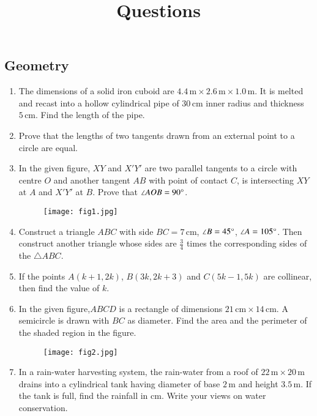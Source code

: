 \documentclass[12pt,letter paper]{article}
\title{Questions}
\date{}
\author{}
\providecommand{\brak}[1]{\ensuremath{\left(#1\right)}}
\begin{document}
\maketitle{}
\begin{center}
	\section*{Geometry}
\end{center}
\begin{enumerate}
    \item The dimensions of a solid iron cuboid are $4.4\,\mathrm{m} \times 2.6\,\mathrm{m} \times 1.0\,\mathrm{m}$. It is melted and recast into a hollow cylindrical pipe of $30\,\mathrm{cm}$ inner radius and thickness $5\,\mathrm{cm}$. Find the length of the pipe.
    \item Prove that the lengths of two tangents drawn from an external point to a circle are equal.
    \item In the given figure, $XY$ and $X'Y'$ are two parallel tangents to a circle with centre $O$ and another tangent $AB$ with point of contact $C$, is intersecting $XY$ at $A$ and $X'Y'$ at $B$. Prove that $\angle AOB = 90\degree$.
\begin{figure}[H]
\centering
\texttt{[image: fig1.jpg]}
\caption{}
\end{figure}
    \item Construct a triangle $ABC$ with side $BC = 7\,\mathrm{cm}$, $\angle B = 45\degree$, $\angle A = 105\degree$. Then construct another triangle whose sides are $\frac{3}{4}$ times the corresponding sides of the $\triangle ABC$.
    \item If the points $A\brak{k + 1, 2k}$, $B\brak{3k, 2k + 3}$ and $C\brak{5k - 1, 5k}$ are collinear, then find the value of $k$.
    \item In the given figure,$ABCD$ is a rectangle of dimensions $21\,\mathrm{cm} \times 14\,\mathrm{cm}$. A semicircle is drawn with $BC$ as diameter. Find the area and the perimeter of the shaded region in the figure.
\begin{figure}[H]
\centering                          
\texttt{[image: fig2.jpg]}
\caption{}
\end{figure}
\item In a rain-water harvesting system, the rain-water from a roof of $22\,\mathrm{m} \times 20\,\mathrm{m}$ drains into a cylindrical tank having diameter of base $2\,\mathrm{m}$ and height $3.5\,\mathrm{m}$. If the tank is full, find the rainfall in $\mathrm{cm}$. Write your views on water conservation.
\end{enumerate}
\end{document}
